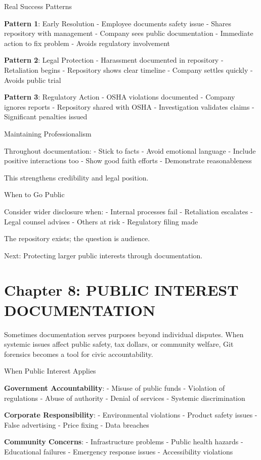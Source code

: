 Real Success Patterns

\textbf{Pattern 1}: Early Resolution - Employee documents safety issue -
Shares repository with management - Company sees public documentation -
Immediate action to fix problem - Avoids regulatory involvement

\textbf{Pattern 2}: Legal Protection - Harassment documented in
repository - Retaliation begins - Repository shows clear timeline -
Company settles quickly - Avoids public trial

\textbf{Pattern 3}: Regulatory Action - OSHA violations documented -
Company ignores reports - Repository shared with OSHA - Investigation
validates claims - Significant penalties issued

Maintaining Professionalism

Throughout documentation: - Stick to facts - Avoid emotional language -
Include positive interactions too - Show good faith efforts -
Demonstrate reasonableness

This strengthens credibility and legal position.

When to Go Public

Consider wider disclosure when: - Internal processes fail - Retaliation
escalates - Legal counsel advises - Others at risk - Regulatory filing
made

The repository exists; the question is audience.

Next: Protecting larger public interests through documentation.

\section{Chapter 8: PUBLIC INTEREST
DOCUMENTATION}\label{chapter-8-public-interest-documentation}

Sometimes documentation serves purposes beyond individual disputes. When
systemic issues affect public safety, tax dollars, or community welfare,
Git forensics becomes a tool for civic accountability.

When Public Interest Applies

\textbf{Government Accountability}: - Misuse of public funds - Violation
of regulations - Abuse of authority - Denial of services - Systemic
discrimination

\textbf{Corporate Responsibility}: - Environmental violations - Product
safety issues - False advertising - Price fixing - Data breaches

\textbf{Community Concerns}: - Infrastructure problems - Public health
hazards - Educational failures - Emergency response issues -
Accessibility violations

